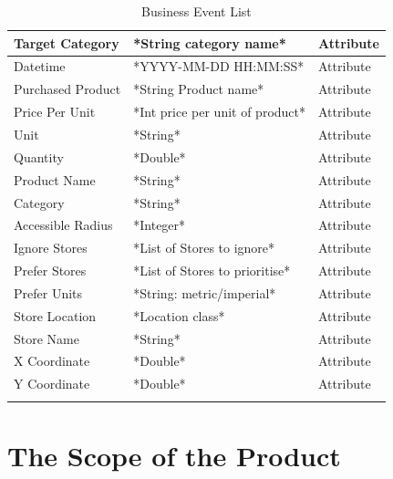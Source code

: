 \documentclass[12pt]{article}
\begin{document}
\begin{longtable}{| >{\raggedright\arraybackslash}p{} | >{\raggedright\arraybackslash}p{} | >{\raggedright\arraybackslash}p{} |}
        Target Category & *String category name* & Attribute \\
        \hline 
        Datetime & *YYYY-MM-DD HH:MM:SS* & Attribute \\
        \hline 
        Purchased Product & *String Product name* & Attribute \\
        \hline 
        Price Per Unit & *Int price per unit of product* & Attribute \\
        \hline 
        Unit & *String* & Attribute \\
        \hline 
        Quantity & *Double* & Attribute \\
        \hline 
        Product Name & *String* & Attribute \\
        \hline 
        Category & *String* & Attribute \\
        \hline 
        Accessible Radius & *Integer* & Attribute \\
        \hline 
        Ignore Stores & *List of Stores to ignore* & Attribute \\
        \hline 
        Prefer Stores & *List of Stores to prioritise* & Attribute \\
        \hline 
        Prefer Units & *String: metric/imperial* & Attribute \\
        \hline
        Store Location & *Location class* & Attribute \\
        \hline 
        Store Name & *String* & Attribute \\
        \hline 
        X Coordinate & *Double* & Attribute \\
        \hline 
        Y Coordinate & *Double* & Attribute \\
        \hline 
        \caption{Business Event List}
        \label{tab:businesseventlist}
    \end{longtable}

\section{The Scope of the Product}
\end{document}

